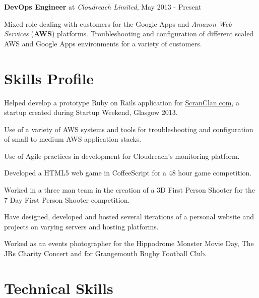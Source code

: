 \documentclass[11pt,a4paper]{article}
\renewenvironment{itemize}{
  \begin{list}{}{
    \setlength{\leftmargin}{1em}
    \setlength{\itemsep}{0.25em}
    \setlength{\parskip}{0pt}
    \setlength{\parsep}{0.25em}
    \renewcommand{\labelitemi}{$\bullet$}
  }
}{
  \end{list}
}
\begin{document}
\begin{itemize}
    \item \textbf{DevOps Engineer} at \emph{Cloudreach Limited}, May 2013 - Present

    Mixed role dealing with customers for the Google Apps and \emph{Amazon Web Services} (\textbf{AWS}) platforms. Troubleshooting and configuration of different scaled AWS and Google Apps environments for a variety of customers.
\end{itemize}

\section*{Skills Profile}

\begin{itemize}
    \item Helped develop a prototype Ruby on Rails application for \href{http://www.ScranClan.com}{ScranClan.com}, a startup created during Startup Weekend, Glasgow 2013.
    \item Use of a variety of AWS systems and tools for troubleshooting and configuration of small to medium AWS application stacks.
    \item Use of Agile practices in development for Cloudreach's monitoring platform.
    \item Developed a HTML5 web game in CoffeeScript for a 48 hour game
        competition.
    \item Worked in a three man team in the creation of a 3D First Person Shooter
        for the 7 Day First Person Shooter competition.
    \item Have designed, developed and hosted several iterations of a personal website and projects on varying servers and hosting platforms.
    \item Worked as an events photographer for the Hippodrome Monster Movie Day, The JRs Charity Concert and for Grangemouth Rugby Football Club.
\end{itemize}

\section*{Technical Skills}

\end{document}
